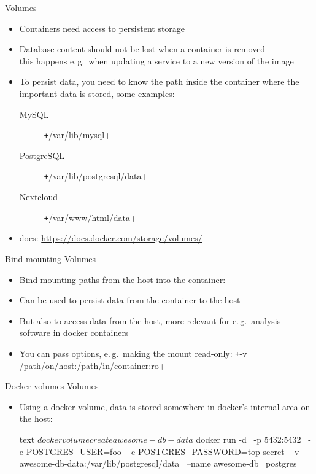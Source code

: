\documentclass[aspectratio=1610]{beamer}
\begin{document}
\begin{frame}[fragile]{Volumes}
  \begin{itemize}
    \item Containers need access to persistent storage
    \item Database content should not be lost when a container is removed\\
      this happens e.\,g.\ when updating a service to a new version of the image
    \item To persist data, you need to know the path inside the container where the
      important data is stored, some examples:
      \begin{description}
        \item[MySQL] \texttt+/var/lib/mysql+
        \item[PostgreSQL] \texttt+/var/lib/postgresql/data+
        \item[Nextcloud] \texttt+/var/www/html/data+
      \end{description}
    \item docs: \url{https://docs.docker.com/storage/volumes/}
  \end{itemize}
\end{frame}

\begin{frame}[fragile]{Bind-mounting Volumes}
  \begin{itemize}
    \item Bind-mounting paths from the host into the container:
    \item Can be used to persist data from the container to the host
    \item But also to access data from the host, more relevant for e.\,g.\ analysis software in docker containers
    \item You can pass options, e.\,g.\ making the mount read-only: \texttt+-v /path/on/host:/path/in/container:ro+
  \end{itemize}
\end{frame}

\begin{frame}[fragile]{Docker volumes Volumes}
  \begin{itemize}
    \item Using a docker volume, data is stored somewhere in docker's internal area on the host:
      \begin{code}{text}
        $ docker volume create awesome-db-data
        $ docker run -d \
          -p 5432:5432 \
          -e POSTGRES_USER=foo \
          -e POSTGRES_PASSWORD=top-secret \
          -v awesome-db-data:/var/lib/postgresql/data \
          --name awesome-db \
          postgres
      \end{code}
  \end{itemize}
\end{frame}
\end{document}
